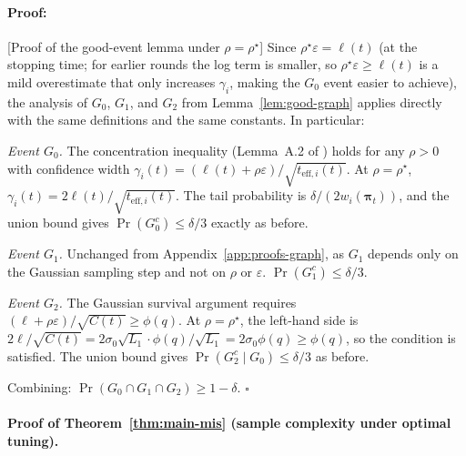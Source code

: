 \documentclass{article}
\newenvironment{proof}{\paragraph{Proof:}}{\hfill$\square$}
\begin{document}
\begin{proof}[Proof of the good-event lemma under $\rho=\rho^\star$]
Since $\rho^\star\varepsilon=\ell(t)$ (at the stopping time; for earlier
rounds the log term is smaller, so $\rho^\star\varepsilon\ge\ell(t)$ is a
mild overestimate that only increases $\gamma_i$, making the $G_0$ event
easier to achieve), the analysis of $G_0$, $G_1$, and $G_2$ from
Lemma~\ref{lem:good-graph} applies directly with the same definitions and
the same constants. In particular:

\emph{Event $G_0$.} The concentration inequality
(Lemma~A.2 of \citealt{thaker2022maximizing}) holds for any $\rho>0$ with
confidence width $\gamma_i(t)=(\ell(t)+\rho\varepsilon)/\sqrt{t_{\mathrm{eff},i}(t)}$.
At $\rho=\rho^\star$, $\gamma_i(t)=2\ell(t)/\sqrt{t_{\mathrm{eff},i}(t)}$.
The tail probability is $\delta/(2w_i(\boldsymbol\pi_t))$, and the union
bound gives $\Pr(G_0^c)\le\delta/3$ exactly as before.

\emph{Event $G_1$.} Unchanged from Appendix~\ref{app:proofs-graph}, as $G_1$
depends only on the Gaussian sampling step and not on $\rho$ or $\varepsilon$.
$\Pr(G_1^c)\le\delta/3$.

\emph{Event $G_2$.} The Gaussian survival argument requires
$(\ell+\rho\varepsilon)/\sqrt{C(t)}\ge\phi(q)$. At $\rho=\rho^\star$, the
left-hand side is $2\ell/\sqrt{C(t)}=2\sigma_0\sqrt{L_1}\cdot\phi(q)/\sqrt{L_1}
=2\sigma_0\phi(q)\ge\phi(q)$, so the condition is satisfied. The union bound
gives $\Pr(G_2^c\mid G_0)\le\delta/3$ as before.

Combining: $\Pr(G_0\cap G_1\cap G_2)\ge 1-\delta$.
\end{proof}

\paragraph{Proof of Theorem~\ref{thm:main-mis} (sample complexity under optimal tuning).}
\end{document}
